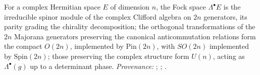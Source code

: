 For a complex Hermitian space $E$ of dimension $n$, the Fock space $\Lambda^{\bullet}E$ is the irreducible spinor module of the complex Clifford algebra on $2n$ generators, its parity grading the chirality decomposition; the orthogonal transformations of the $2n$ Majorana generators preserving the canonical anticommutation relations form the compact $O(2n)$, implemented by $\mathrm{Pin}(2n)$, with $SO(2n)$ implemented by $\mathrm{Spin}(2n)$; those preserving the complex structure form $U(n)$, acting as $\Lambda^{\bullet}(g)$ up to a determinant phase. \emph{Provenance:} \cite[Fact~2.11]{ButlerT12}; \cite[Lecture~20]{FultonHarris1991}; \cite[Ch.~I, \S\S 2, 5]{LawsonMichelsohn1989}.
